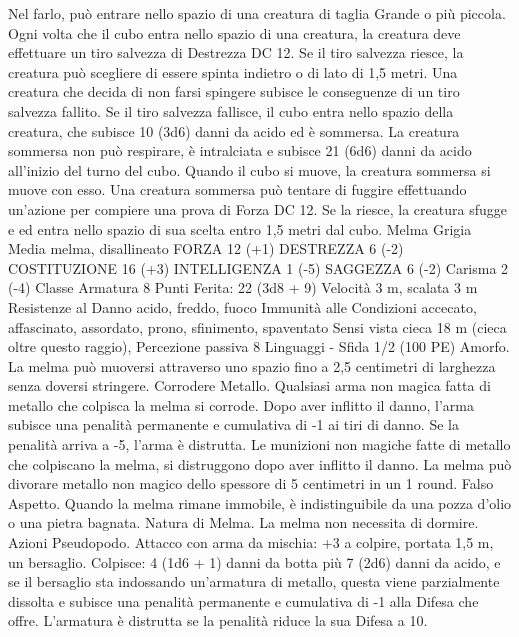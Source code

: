 \begin{multicols}{2}
Nel farlo, può entrare nello spazio di una creatura di taglia Grande o
più piccola. Ogni volta che il cubo entra nello spazio di una creatura,
la creatura deve effettuare un tiro salvezza di Destrezza DC 12.
Se il tiro salvezza riesce, la creatura può scegliere di essere spinta
indietro o di lato di 1,5 metri. Una creatura che decida di non farsi
spingere subisce le conseguenze di un tiro salvezza fallito.
Se il tiro salvezza fallisce, il cubo entra nello spazio della creatura,
che subisce 10 (3d6) danni da acido ed è sommersa. La creatura
sommersa non può respirare, è intralciata e subisce 21 (6d6) danni da
acido all’inizio del turno del cubo. Quando il cubo si muove, la
creatura sommersa si muove con esso.
Una creatura sommersa può tentare di fuggire effettuando un’azione
per compiere una prova di Forza DC 12. Se la riesce, la creatura
sfugge e ed entra nello spazio di sua scelta entro 1,5 metri dal cubo.
Melma Grigia
Media melma, disallineato
FORZA 12 (+1)
DESTREZZA 6 (-2)
COSTITUZIONE 16 (+3)
INTELLIGENZA 1 (-5)
SAGGEZZA 6 (-2)
Carisma 2 (-4)
Classe Armatura 8
\hspace*{0pt}\hfill{Punti Ferita}: 22 (3d8 + 9)
Velocità 3 m, scalata 3 m
Resistenze al Danno acido, freddo, fuoco
Immunità alle Condizioni accecato, affascinato, assordato,
prono, sfinimento, spaventato
Sensi vista cieca 18 m (cieca oltre questo raggio), Percezione
passiva 8
Linguaggi -
Sfida 1/2 (100 PE)
Amorfo. La melma può muoversi attraverso uno spazio fino a 2,5
centimetri di larghezza senza doversi stringere.
Corrodere Metallo. Qualsiasi arma non magica fatta di metallo che
colpisca la melma si corrode. Dopo aver inflitto il danno, l’arma
subisce una penalità permanente e cumulativa di -1 ai tiri di danno.
Se la penalità arriva a -5, l’arma è distrutta. Le munizioni non
magiche fatte di metallo che colpiscano la melma, si distruggono
dopo aver inflitto il danno.
La melma può divorare metallo non magico dello spessore di 5
centimetri in un 1 round.
Falso Aspetto. Quando la melma rimane immobile, è
indistinguibile da una pozza d’olio o una pietra bagnata.
Natura di Melma. La melma non necessita di dormire.
Azioni
Pseudopodo. Attacco con arma da mischia: +3 a colpire, portata
1,5 m, un bersaglio.
Colpisce: 4 (1d6 + 1) danni da botta più 7 (2d6) danni da
acido, e se il bersaglio sta indossando un’armatura di metallo,
questa viene parzialmente dissolta e subisce una penalità
permanente e cumulativa di -1 alla Difesa che offre. L’armatura è
distrutta se la penalità riduce la sua Difesa a 10.
 

\end{multicols}
